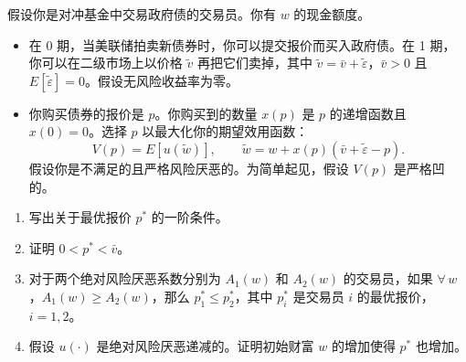 \begin{problem}
 假设你是对冲基金中交易政府债的交易员。你有 $w$ 的现金额度。
\begin{itemize}
    \item 在 0 期，当美联储拍卖新债券时，你可以提交报价而买入政府债。在 1 期，你可以在二级市场上以价格 $\tilde{v}$ 再把它们卖掉，其中 $\tilde{v}=\bar{v}+\tilde{\varepsilon}$，$\bar{v}>0$ 且 $E[\tilde{\varepsilon}]=0$。假设无风险收益率为零。
    \item 你购买债券的报价是 $p$。你购买到的数量 $x(p)$ 是 $p$ 的递增函数且 $x(0)=0$。选择 $p$ 以最大化你的期望效用函数：
    \[
        V(p)=E[u(\tilde{w})],\qquad \tilde{w}=w+x(p)(\bar{v}+\tilde{\varepsilon}-p).
    \]
    假设你是不满足的且严格风险厌恶的。为简单起见，假设 $V(p)$ 是严格凹的。
\end{itemize}
\begin{enumerate}[label=(\alph*)]
    \item 写出关于最优报价 $p^{*}$ 的一阶条件。
    \item 证明 $0<p^{*}<\bar{v}$。
    \item 对于两个绝对风险厌恶系数分别为 $A_{1}(w)$ 和 $A_{2}(w)$ 的交易员，如果 $\forall\,w$，$A_{1}(w)\ge A_{2}(w)$，那么 $p_{1}^{*}\le p_{2}^{*}$，其中 $p_{i}^{*}$ 是交易员 $i$ 的最优报价，$i=1,2$。
    \item 假设 $u(\cdot)$ 是绝对风险厌恶递减的。证明初始财富 $w$ 的增加使得 $p^{*}$ 也增加。
\end{enumerate}
\end{problem}
